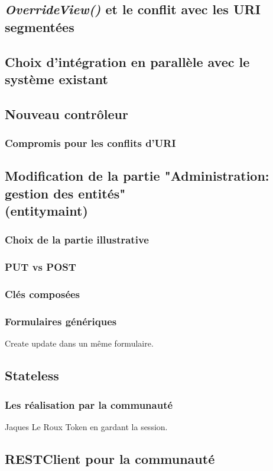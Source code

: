 \subsection{\textit{OverrideView()} et le conflit avec les URI segmentées}
\subsection{Choix d'intégration en parallèle avec le système existant }
\subsection{Nouveau contrôleur}
\subsubsection{Compromis pour les conflits d'URI}

\subsection{Modification de la partie "Administration: gestion des entités"\\ (entitymaint)  }
\subsubsection{Choix de la partie illustrative}
\subsubsection{PUT vs POST}
\subsubsection{Clés composées}
\subsubsection{Formulaires génériques }
Create update dans un même formulaire.
\subsection{Stateless}
\subsubsection{Les réalisation par la communauté}

Jaques Le Roux Token en gardant la session.
\subsection{RESTClient pour la communauté}
